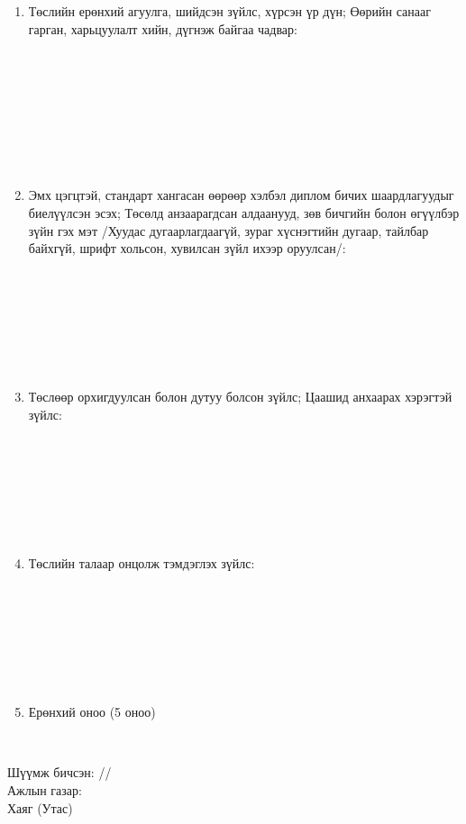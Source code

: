 \begin{titlepage}
\begin{enumerate}
\begin{center}
\dotfill \\[0.4cm]
\end{center}
\item Төслийн ерөнхий агуулга, шийдсэн зүйлс, хүрсэн үр дүн; Өөрийн санааг гарган, харьцуулалт хийн, дүгнэж байгаа чадвар:
\begin{center}
\dotfill \\[0.1cm]
\dotfill \\[0.1cm]
\dotfill \\[0.1cm]
\dotfill \\[0.1cm]
\dotfill \\[0.1cm]
\dotfill \\[0.1cm]
\dotfill \\[0.4cm]
\end{center}
\item Эмх цэгцтэй, стандарт хангасан өөрөөр хэлбэл диплом бичих шаардлагуудыг биелүүлсэн эсэх; Төсөлд анзаарагдсан алдаанууд, зөв бичгийн болон өгүүлбэр зүйн гэх мэт /Хуудас дугаарлагдаагүй, зураг хүснэгтийн дугаар, тайлбар байхгүй, шрифт хольсон, хувилсан зүйл ихээр оруулсан/:
\begin{center}
\dotfill \\[0.1cm]
\dotfill \\[0.1cm]
\dotfill \\[0.1cm]
\dotfill \\[0.1cm]
\dotfill \\[0.1cm]
\dotfill \\[0.4cm]
\end{center}
\item Төслөөр орхигдуулсан болон дутуу болсон зүйлс; Цаашид анхаарах хэрэгтэй зүйлс:
\begin{center}
\dotfill \\[0.1cm]
\dotfill \\[0.1cm]
\dotfill \\[0.1cm]
\dotfill \\[0.1cm]
\dotfill \\[0.1cm]
\dotfill \\[0.4cm]
\end{center}
\item Төслийн талаар онцолж тэмдэглэх зүйлс:
\begin{center}
\dotfill \\[0.1cm]
\dotfill \\[0.1cm]
\dotfill \\[0.1cm]
\dotfill \\[0.1cm]
\dotfill \\[0.1cm]
\dotfill \\[0.4cm]
\end{center}
\item Ерөнхий оноо (5 оноо)
\begin{center}
\dotfill \\[1cm]
\end{center}
\end{enumerate}
Шүүмж бичсэн: \makebox[3cm]{\dotfill} /\readname/ \\[0.5cm]
Ажлын газар: \dotfill \\[0.5cm]
Хаяг (Утас) \makebox[5cm]{\dotfill}
\end{titlepage}
